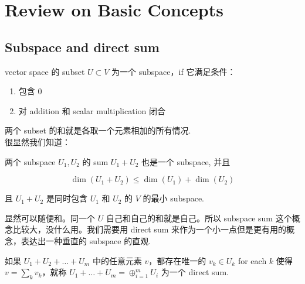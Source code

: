 \chapter{Review on Basic Concepts}

\section{Subspace and direct sum}

\begin{definition}{}\label{subspace}

vector space 的 subset \(U \subset V\) 为一个 subspace，if 它满足条件：

\begin{enumerate}
\tightlist
\item
  包含 0
\item
  对 addition 和 scalar multiplication 闭合
\end{enumerate}

\end{definition}

两个 subset 的和就是各取一个元素相加的所有情况.\\
很显然我们知道：

\begin{proposition}

两个 subspace \(U_{1},U_{2}\) 的 sum \(U_{1} + U_{2}\) 也是一个 subspace, 并且

\[\dim\left( {U_{1} + U_{2}} \right) \leq \dim\left( U_{1} \right) + \dim\left( U_{2} \right)\]

且 \(U_{1} + U_{2}\) 是同时包含 \(U_{1}\) 和 \(U_{2}\) 的 \(V\) 的最小 subspace.

\end{proposition}

显然可以随便和。同一个 \(U\) 自己和自己的和就是自己。所以 subspace sum 这个概念比较大，没什么用。我们需要用 direct sum 来作为一个小一点但是更有用的概念，表达出一种垂直的 subspace 的直观.

\begin{definition}{}\label{direct sum}

如果 \(U_{1} + U_{2} + \ldots + U_{m}\) 中的任意元素 \(v\)，都存在唯一的 \(v_{k} \in U_{k}\) for each \(k\) 使得 \(v = \sum_{k}v_{k}\)，就称 \(U_{1} + \ldots + U_{m} = \oplus_{i = 1}^{m}U_{i}\) 为一个 direct sum.

\end{definition}

